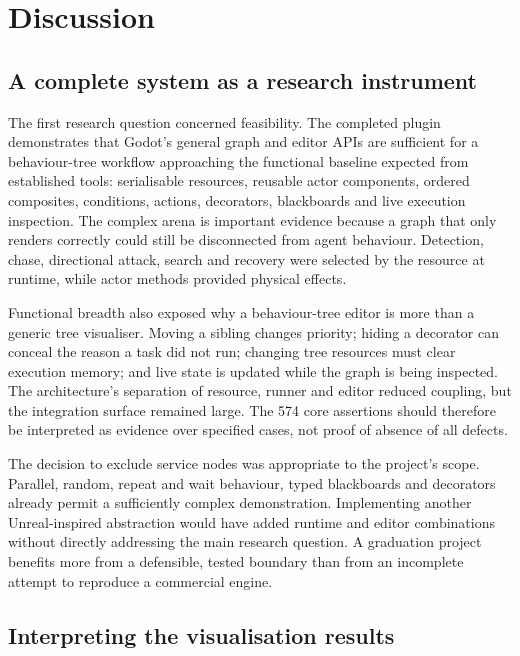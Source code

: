 \chapter{Discussion}
\label{ch:discussion}

\section{A complete system as a research instrument}

The first research question concerned feasibility. The completed plugin demonstrates that Godot's general graph and editor APIs are sufficient for a behaviour-tree workflow approaching the functional baseline expected from established tools: serialisable resources, reusable actor components, ordered composites, conditions, actions, decorators, blackboards and live execution inspection. The complex arena is important evidence because a graph that only renders correctly could still be disconnected from agent behaviour. Detection, chase, directional attack, search and recovery were selected by the resource at runtime, while actor methods provided physical effects.

Functional breadth also exposed why a behaviour-tree editor is more than a generic tree visualiser. Moving a sibling changes priority; hiding a decorator can conceal the reason a task did not run; changing tree resources must clear execution memory; and live state is updated while the graph is being inspected. The architecture's separation of resource, runner and editor reduced coupling, but the integration surface remained large. The 574 core assertions should therefore be interpreted as evidence over specified cases, not proof of absence of all defects.

The decision to exclude service nodes was appropriate to the project's scope. Parallel, random, repeat and wait behaviour, typed blackboards and decorators already permit a sufficiently complex demonstration. Implementing another Unreal-inspired abstraction would have added runtime and editor combinations without directly addressing the main research question. A graduation project benefits more from a defensible, tested boundary than from an incomplete attempt to reproduce a commercial engine.

\section{Interpreting the visualisation results}

